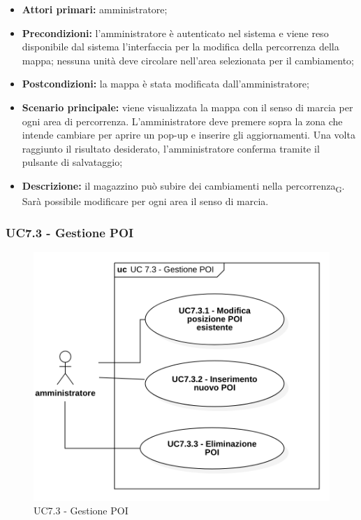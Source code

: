 \begin{itemize}

  \item   \textbf{Attori primari:} amministratore;

  \item   \textbf{Precondizioni:}  l'amministratore è autenticato nel sistema e viene reso disponibile dal sistema l'interfaccia per la modifica della percorrenza della mappa; nessuna unità deve circolare nell'area selezionata per il cambiamento;

  \item   \textbf{Postcondizioni:} la mappa è stata modificata dall'amministratore;
 \item   \textbf{Scenario principale:} viene visualizzata la mappa con il senso di marcia per ogni area di percorrenza. L'amministratore deve premere sopra la zona che intende cambiare per aprire un pop-up e inserire gli aggiornamenti. Una volta raggiunto il risultato desiderato, l'amministratore conferma tramite il pulsante di salvataggio;

  \item   \textbf{Descrizione:} il magazzino può subire dei cambiamenti nella percorrenza\textsubscript{G}. Sarà possibile modificare per ogni area il senso di marcia.

\end{itemize}



\subsubsection{UC7.3 - Gestione POI}



\begin{figure}[H]

 \centering

 \includegraphics[scale=0.52]{res/images/uc7-3.png}

 \caption{UC7.3 - Gestione POI}

\end{figure}



